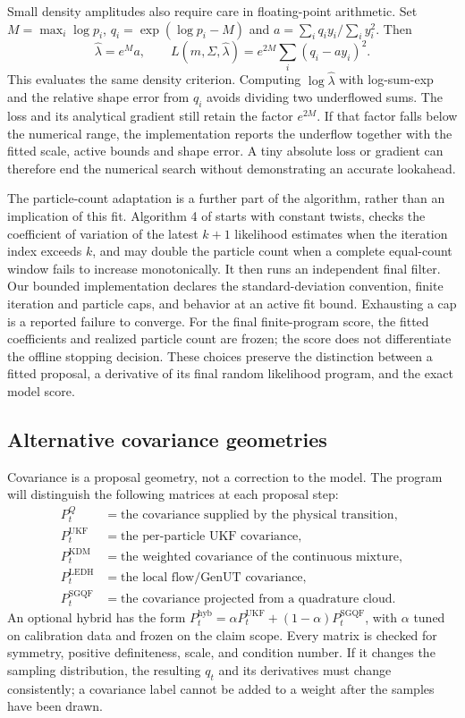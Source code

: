 \documentclass[11pt]{article}
\begin{document}
Small density amplitudes also require care in floating-point arithmetic.
Set $M=\max_i\log p_i$, $q_i=\exp(\log p_i-M)$ and
$a=\sum_i q_i y_i/\sum_i y_i^2$. Then
\[
 \widehat\lambda=e^M a,\qquad
 L(m,\Sigma,\widehat\lambda)
   =e^{2M}\sum_i(q_i-a y_i)^2.
\]
This evaluates the same density criterion. Computing $\log\widehat\lambda$
with log-sum-exp and the relative shape error from $q_i$ avoids dividing two
underflowed sums. The loss and its analytical gradient still retain the
factor $e^{2M}$. If that factor falls below the numerical range, the
implementation reports the underflow together with the fitted scale, active
bounds and shape error. A tiny absolute loss or gradient can therefore end
the numerical search without demonstrating an accurate lookahead.

The particle-count adaptation is a further part of the algorithm, rather
than an implication of this fit. Algorithm 4 of \citet{guarniero2017iapf}
starts with constant twists, checks the coefficient of variation of the
latest $k+1$ likelihood estimates when the iteration index exceeds $k$,
and may double the particle count when a complete equal-count window fails
to increase monotonically. It then runs an independent final filter. Our
bounded implementation declares the standard-deviation convention, finite
iteration and particle caps, and behavior at an active fit bound. Exhausting
a cap is a reported failure to converge. For the final finite-program score,
the fitted coefficients and realized particle count are frozen; the score
does not differentiate the offline stopping decision. These choices preserve
the distinction between a fitted proposal, a derivative of its final random
likelihood program, and the exact model score.

\subsection{Alternative covariance geometries}

Covariance is a proposal geometry, not a correction to the model. The program
will distinguish the following matrices at each proposal step:
\begin{align}
 P_t^{Q}&=\text{the covariance supplied by the physical transition},\\
 P_t^{\mathrm{UKF}}&=\text{the per-particle UKF covariance},\\
 P_t^{\mathrm{KDM}}&=\text{the weighted covariance of the continuous mixture},\\
 P_t^{\mathrm{LEDH}}&=\text{the local flow/GenUT covariance},\\
 P_t^{\mathrm{SGQF}}&=\text{the covariance projected from a quadrature cloud}.
\end{align}
An optional hybrid has the form
$P_t^{\mathrm{hyb}}=\alpha P_t^{\mathrm{UKF}}+(1-\alpha)P_t^{\mathrm{SGQF}}$,
with $\alpha$ tuned on calibration data and frozen on the claim scope. Every
matrix is checked for symmetry, positive definiteness, scale, and condition
number. If it changes the sampling distribution, the resulting $q_t$ and its
derivatives must change consistently; a covariance label cannot be added to a
weight after the samples have been drawn.
\end{document}

